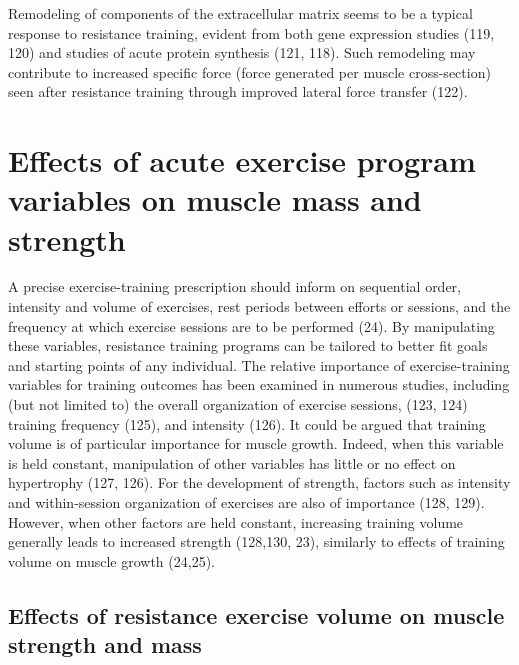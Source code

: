 \documentclass[twoside,10pt]{gihclass} %
\begin{document}
Remodeling of components of the extracellular matrix seems to be a typical response to resistance training, evident from both gene expression studies
(119, 120)
and studies of acute protein synthesis
(121, 118).
Such remodeling may contribute to increased specific force (force generated per muscle cross-section) seen after resistance training through improved lateral force transfer
(122).

\hypertarget{effects-of-acute-exercise-program-variables-on-muscle-mass-and-strength}{%
\section{Effects of acute exercise program variables on muscle mass and strength}\label{effects-of-acute-exercise-program-variables-on-muscle-mass-and-strength}}

A precise exercise-training prescription should inform on sequential order, intensity and volume of exercises, rest periods between efforts or sessions, and the frequency at which exercise sessions are to be performed
(24).
By manipulating these variables, resistance training programs can be tailored to better fit goals and starting points of any individual.
The relative importance of exercise-training variables for training outcomes has been examined in numerous studies, including (but not limited to) the overall organization of exercise sessions,
(123, 124)
training frequency
(125),
and intensity
(126).
It could be argued that training volume is of particular importance for muscle growth.
Indeed, when this variable is held constant, manipulation of other variables has little or no effect on hypertrophy
(127, 126).
For the development of strength, factors such as intensity and within-session organization of exercises are also of importance
(128, 129).
However, when other factors are held constant, increasing training volume generally leads to increased strength
(128,130, 23),
similarly to effects of training volume on muscle growth
(24,25).

\hypertarget{effects-of-resistance-exercise-volume-on-muscle-strength-and-mass}{%
\subsection{Effects of resistance exercise volume on muscle strength and mass}\label{effects-of-resistance-exercise-volume-on-muscle-strength-and-mass}}
\end{document}
